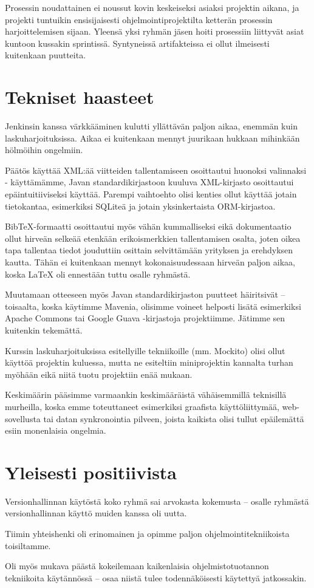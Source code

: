 \documentclass{article}
\begin{document}
Prosessin noudattainen ei noussut kovin keskeiseksi asiaksi projektin aikana, ja projekti tuntuikin ensisijaisesti ohjelmointiprojektilta ketterän prosessin harjoittelemisen sijaan. Yleensä yksi ryhmän jäsen hoiti prosessiin liittyvät asiat kuntoon kussakin sprintissä. Syntyneissä artifakteissa ei ollut ilmeisesti kuitenkaan puutteita.

\section{Tekniset haasteet}

Jenkinsin kanssa värkkääminen kulutti yllättävän paljon aikaa, enemmän kuin laskuharjoituksissa. Aikaa ei kuitenkaan mennyt juurikaan hukkaan mihinkään hölmöihin ongelmiin.

Päätös käyttää XML:ää viitteiden tallentamiseen osoittautui huonoksi valinnaksi - käyttämämme, Javan standardikirjastoon kuuluva XML-kirjasto osoittautui epäintuitiiviseksi käyttää. Parempi vaihtoehto olisi kenties ollut käyttää jotain tietokantaa, esimerkiksi SQLiteä ja jotain yksinkertaista ORM-kirjastoa.

BibTeX-formaatti osoittautui myös vähän kummalliseksi eikä dokumentaatio ollut hirveän selkeää etenkään erikoismerkkien tallentamisen osalta, joten oikea tapa tallentaa tiedot jouduttiin osittain selvittämään yrityksen ja erehdyksen kautta. Tähän ei kuitenkaan mennyt kokonaisuudessaan hirveän paljon aikaa, koska LaTeX oli ennestään tuttu osalle ryhmästä.

Muutamaan otteeseen myös Javan standardikirjaston puutteet häiritsivät -- toisaalta, koska käytimme Mavenia, olisimme voineet helposti lisätä esimerkiksi Apache Commons tai Google Guava -kirjastoja projektiimme. Jätimme sen kuitenkin tekemättä.

Kurssin laskuharjoituksissa esitellyille tekniikoille (mm. Mockito) olisi ollut käyttöä projektin kuluessa, mutta ne esiteltiin miniprojektin kannalta turhan myöhään eikä niitä tuotu projektiin enää mukaan.

Keskimäärin pääsimme varmaankin keskimääräistä vähäisemmillä teknisillä murheilla, koska emme toteuttaneet esimerkiksi graafista käyttöliittymää, web-sovellusta tai datan synkronointia pilveen, joista kaikista olisi tullut epäilemättä esiin monenlaisia ongelmia.

\section{Yleisesti positiivista}

Versionhallinnan käytöstä koko ryhmä sai arvokasta kokemusta -- osalle ryhmästä versionhallinnan käyttö muiden kanssa oli uutta.

Tiimin yhteishenki oli erinomainen ja opimme paljon ohjelmointitekniikoista toisiltamme.

Oli myös mukava päästä kokeilemaan kaikenlaisia ohjelmistotuotannon tekniikoita käytännössä -- osaa niistä tulee todennäköisesti käytettyä jatkossakin.
\end{document}
